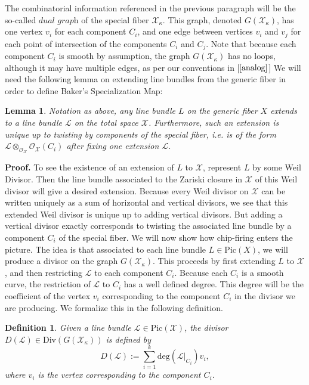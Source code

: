 \documentclass{article}
\newtheorem{lemma}[theorem]{Lemma}
\newtheorem{definition}{Definition}[section]
\begin{document}
The combinatorial information referenced in the previous paragraph will be the so-called $\textit{dual graph}$ of the special fiber $\mathcal{X}_{\kappa}$. This graph, denoted $G(\mathcal{X}_{\kappa})$, has one vertex $v_i$ for each component $C_i$, and one edge between vertices $v_i$ and $v_j$ for each point of intersection of the components $C_i$ and $C_j$. Note that because each component $C_i$ is smooth by assumption, the graph $G(\mathcal{X}_{\kappa})$ has no loops, although it may have multiple edges, as per our conventions in [$\ref{analog}$]
\newline
\newline
We will need the following lemma on extending line bundles from the generic fiber in order to define Baker's Specialization Map:
\begin{lemma}
\label{extend}
Notation as above, any line bundle $L$ on the generic fiber $X$ extends to a line bundle $\mathcal{L}$ on the total space $\mathcal{X}$. Furthermore, such an extension is unique up to twisting by components of the special fiber, i.e. is of the form $\mathcal{L}\otimes_{\mathcal{O}_{\mathcal{X}}}\mathcal{O}_{\mathcal{X}}(C_i)$ after fixing one extension $\mathcal{L}$.  
\end{lemma}
\textbf{Proof.} To see the existence of an extension of $L$ to $\mathcal{X}$, represent $L$ by some Weil Divisor. Then the line bundle associated to the Zariski closure in $\mathcal{X}$ of this Weil divisor will give a desired extension. Because every Weil divisor on $\mathcal{X}$ can be written uniquely as a sum of horizontal and vertical divisors, we see that this extended Weil divisor is unique up to adding vertical divisors. But adding a vertical divisor exactly corresponds to twisting the associated line bundle by a component $C_i$ of the special fiber. 
\newline
\newline
We will now show how chip-firing enters the picture. The idea is that associated to each line bundle $L\in \text{Pic}(X)$, we will produce a divisor on the graph $G(\mathcal{X}_{\mathcal{\kappa}})$. This proceeds by first extending $L$ to $\mathcal{X}$, and then restricting $\mathcal{L}$ to each component $C_i$. Because each $C_i$ is a smooth curve, the restriction of $\mathcal{L}$ to $C_i$ has a well defined degree. This degree will be the coefficient of the vertex $v_i$ corresponding to the component $C_i$ in the divisor we are producing. We formalize this in the following definition.
\begin{definition}
Given a line bundle $\mathcal{L}\in \text{Pic}(\mathcal{X})$, the divisor $D(\mathcal{L})\in \text{Div}(G(\mathcal{X}_{\mathcal{\kappa}}))$ is defined by
\[
D(\mathcal{L}) := \sum_{i = 1}^{k} \text{deg}(\mathcal{L}|_{C_i})v_i,
\]
where $v_i$ is the vertex corresponding to the component $C_i$. 
\end{definition}
\end{document}
